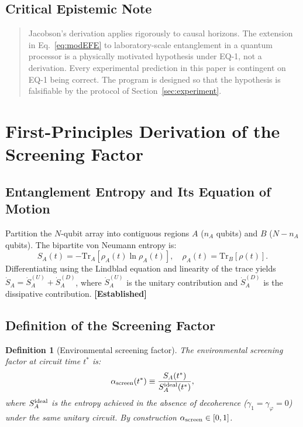 \documentclass[12pt]{article}
\newtheorem{definition}{Definition}
\newcommand{\established}{\textbf{[Established]}}
\begin{document}
\subsection{Critical Epistemic Note}

\begin{quote}
Jacobson's derivation applies rigorously to causal horizons. The extension in
Eq.~\eqref{eq:modEFE} to laboratory-scale entanglement in a quantum processor is
a physically motivated hypothesis under EQ-1, not a derivation. Every
experimental prediction in this paper is contingent on EQ-1 being correct.
The program is designed so that the hypothesis is falsifiable by the protocol of
Section~\ref{sec:experiment}.
\end{quote}

\section{First-Principles Derivation of the Screening Factor}
\label{sec:screening}

\subsection{Entanglement Entropy and Its Equation of Motion}

Partition the $N$-qubit array into contiguous regions $A$ ($n_A$ qubits) and $B$
($N-n_A$ qubits). The bipartite von Neumann entropy is:
\begin{equation}
S_A(t) = -\mathrm{Tr}_A[\rho_A(t)\ln\rho_A(t)], \quad
\rho_A(t) = \mathrm{Tr}_B[\rho(t)].
\label{eq:vN}
\end{equation}
Differentiating using the Lindblad equation and linearity of the trace yields
$\dot{S}_A = \dot{S}_A^{(U)} + \dot{S}_A^{(D)}$,
where $\dot{S}_A^{(U)}$ is the unitary contribution and $\dot{S}_A^{(D)}$ is the
dissipative contribution. \established

\subsection{Definition of the Screening Factor}

\begin{definition}[Environmental screening factor]
\label{def:screen}
The environmental screening factor at circuit time $t^*$ is:
\begin{equation}
\alpha_{\rm screen}(t^*) \equiv
\frac{S_A(t^*)}{S_A^{\rm ideal}(t^*)},
\label{eq:screen_def}
\end{equation}
where $S_A^{\rm ideal}$ is the entropy achieved in the absence of decoherence
($\gamma_1 = \gamma_\varphi = 0$) under the same unitary circuit. By construction
$\alpha_{\rm screen}\in[0,1]$.
\end{definition}
\end{document}
